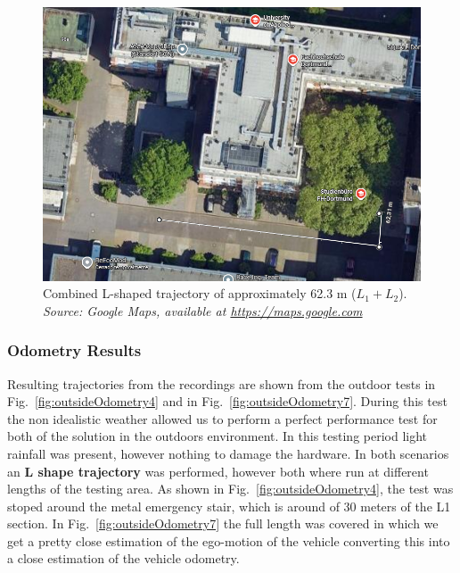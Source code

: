 \begin{figure}[!htbp]
    \centering
    \includegraphics[width=0.9\linewidth]{images/FH_ParkingLot_TotalDistance.png}
    \caption{Combined L-shaped trajectory of approximately 62.3 m ($L_1 + L_2$).\\
    \textit{Source: Google Maps, available at \url{https://maps.google.com} \cite{googlemaps_fhdo}}}
    \label{fig:parkinglot_totaldistance}
\end{figure}

\subsubsection{Odometry Results}
Resulting trajectories from the recordings are shown from the outdoor tests in Fig.~\ref{fig:outsideOdometry4} and in Fig.~\ref{fig:outsideOdometry7}.
During this test the non idealistic weather allowed us to perform a perfect performance test for both of the solution in the outdoors environment.
In this testing period light rainfall was present, however nothing to damage the hardware.
In both scenarios an \textbf{L shape trajectory} was performed, however both where run at different lengths of the testing area.
As shown in Fig.~\ref{fig:outsideOdometry4}, the test was stoped around the metal emergency stair, which is around of 30 meters of the L1 section.
In Fig.~\ref{fig:outsideOdometry7} the full length was covered in which we get a pretty close estimation of the ego-motion of the vehicle converting this into a close estimation of the vehicle odometry.

